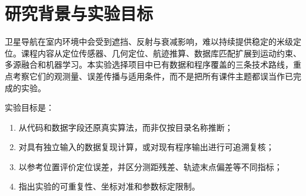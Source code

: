 \section{研究背景与实验目标}
卫星导航在室内环境中会受到遮挡、反射与衰减影响，难以持续提供稳定的米级定位。课程内容从定位传感器、几何定位、航迹推算、数据库匹配扩展到运动约束、多源融合和机器学习。本实验选择项目中已有数据和程序覆盖的三条技术路线，重点考察它们的观测量、误差传播与适用条件，而不是把所有课件主题都误当作已完成的实验。

实验目标是：
\begin{enumerate}
    \item 从代码和数据字段还原真实算法，而非仅按目录名称推断；
    \item 对具有独立输入的数据复现计算，或对现有程序输出进行可追溯复核；
    \item 以参考位置评价定位误差，并区分测距残差、轨迹末点偏差等不同指标；
    \item 指出实验的可重复性、坐标对准和参数标定限制。
\end{enumerate}



